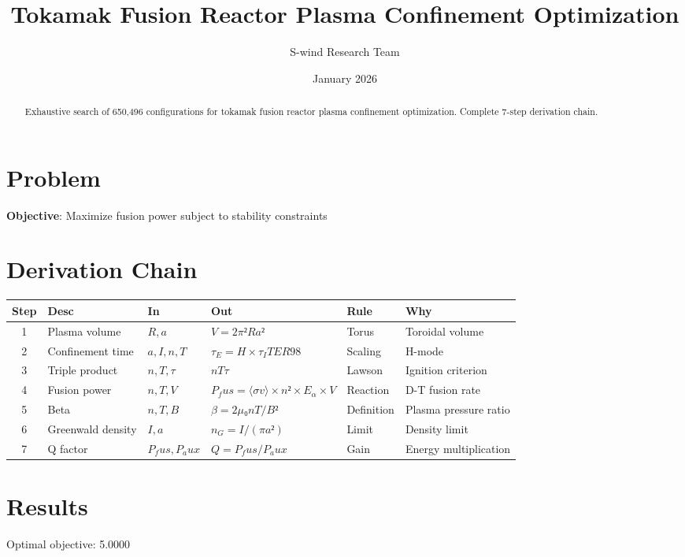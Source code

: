 \documentclass[11pt]{article}
\title{Tokamak Fusion Reactor Plasma Confinement Optimization}
\author{S-wind Research Team}
\date{January 2026}
\begin{document}
\maketitle

\begin{abstract}
Exhaustive search of 650,496 configurations for tokamak fusion reactor plasma confinement optimization. Complete 7-step derivation chain.
\end{abstract}

\section{Problem}
\textbf{Objective}: Maximize fusion power subject to stability constraints

\section{Derivation Chain}
\begin{longtable}{|c|p{2cm}|p{2cm}|p{3cm}|p{2cm}|p{3cm}|}
\hline
Step & Desc & In & Out & Rule & Why\\\hline\endhead
1 & Plasma volume & $R, a$ & $V = 2π²Ra²$ & Torus & Toroidal volume\\\hline
2 & Confinement time & $a, I, n, T$ & $τ_E = H × τ_ITER98$ & Scaling & H-mode\\\hline
3 & Triple product & $n, T, τ$ & $nTτ$ & Lawson & Ignition criterion\\\hline
4 & Fusion power & $n, T, V$ & $P_fus = ⟨σv⟩ × n² × E_α × V$ & Reaction & D-T fusion rate\\\hline
5 & Beta & $n, T, B$ & $β = 2μ₀nT/B²$ & Definition & Plasma pressure ratio\\\hline
6 & Greenwald density & $I, a$ & $n_G = I/(πa²)$ & Limit & Density limit\\\hline
7 & Q factor & $P_fus, P_aux$ & $Q = P_fus / P_aux$ & Gain & Energy multiplication\\\hline
\end{longtable}

\section{Results}
Optimal objective: 5.0000
\end{document}
